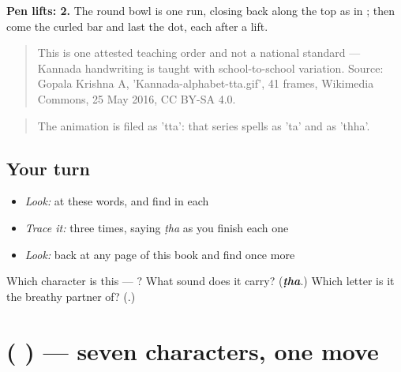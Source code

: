 \textbf{Pen lifts: 2.} The round bowl is one run, closing back along the top as in ; then come the curled bar and last the dot, each after a lift.

\begin{quote}
This is one attested teaching order and not a national standard — Kannada handwriting is taught with school-to-school variation. Source: Gopala Krishna A, 'Kannada-alphabet-tta.gif', 41 frames, Wikimedia Commons, 25 May 2016, CC BY-SA 4.0.
\end{quote}

\begin{quote}
The animation is filed as 'tta': that series spells  as 'ta' and  as 'thha'.
\end{quote}

\subsection*{Your turn}
\begin{itemize}
\raggedright
  \item \emph{Look:} at these words, and find  in each
\end{itemize}

\begin{quote}
\end{quote}

\begin{itemize}
\raggedright
  \item \emph{Trace it:}  three times, saying \emph{ṭha} as you finish each one
  \item \emph{Look:} back at any page of this book and find  once more
\end{itemize}

\begin{tcolorbox}[breakable,colback=teal!4,colframe=teal!35!black,title={Before you move on}]
Which character is this — ? What sound does it carry? (\emph{\textbf{ṭha}}.) Which letter is it the breathy partner of? (\textbf{}.)
\end{tcolorbox}
\section[\texorpdfstring{(\kn{ಖ} \kn{ಘ} \kn{ಠ} \kn{ಢ} \kn{ಧ} \kn{ಫ} \kn{ಭ})}{(ಖ ಘ ಠ ಢ ಧ ಫ ಭ)}]{(      ) — seven characters, one move}

\label{lesson:KA-R80-the-breath}



